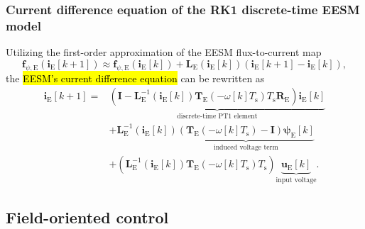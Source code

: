 \begin{frame}
    \frametitle{Current difference equation of the RK1 discrete-time EESM model}
    Utilizing the first-order approximation of the EESM flux-to-current map
    \begin{equation}
        \bm{f}_{\psi,\mathrm{E}}(\bm{i}_\mathrm{E}[k+1]) \approx \bm{f}_{\psi,\mathrm{E}}(\bm{i}_\mathrm{E}[k]) + \bm{L}_\mathrm{E}(\bm{i}_\mathrm{E}[k])\left(\bm{i}_\mathrm{E}[k+1] - \bm{i}_\mathrm{E}[k]\right),
    \end{equation}\pause%
    the \hl{EESM's current  difference equation} can be rewritten as
    \begin{equation}
        \begin{split}
            \bm{i}_\mathrm{E}[k+1] = & \underbrace{\left(\bm{I} - \bm{L}_\mathrm{E}^{-1}(\bm{i}_\mathrm{E}[k])\bm{T}_\mathrm{E}(-\omega[k]T_\mathrm{s})T_\mathrm{s}\bm{R}_\mathrm{E}\right)\bm{i}_\mathrm{E}[k]}_{\text{discrete-time PT1 element}} \\
                                     & + \bm{L}_\mathrm{E}^{-1}(\bm{i}_\mathrm{E}[k])\underbrace{\left(\bm{T}_\mathrm{E}(-\omega[k]T_\mathrm{s}) - \bm{I}\right)\bm{\psi}_\mathrm{E}[k]}_{\text{induced voltage term}}                              \\
                                     & + \left(\bm{L}_\mathrm{E}^{-1}(\bm{i}_\mathrm{E}[k])\bm{T}_\mathrm{E}(-\omega[k]T_\mathrm{s})T_\mathrm{s}\right)\underbrace{\bm{u}_\mathrm{E}[k]}_{\text{input voltage}}.
        \end{split}
        \label{eq:current_diff_eq_RK1_EESM}
    \end{equation}
\end{frame}


\subsection{Field-oriented control}
\label{subsec:FOC_SM}

